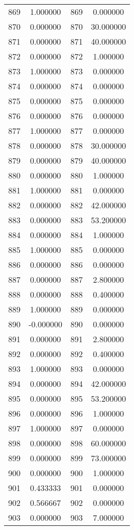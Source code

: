\documentclass[12pt]{article}
\begin{document}
\begin{longtable}{@{}cccc@{}}
869 & 1.000000 & 869 & 0.000000 \\
870 & 0.000000 & 870 & 30.000000 \\
871 & 0.000000 & 871 & 40.000000 \\
872 & 0.000000 & 872 & 1.000000 \\
873 & 1.000000 & 873 & 0.000000 \\
874 & 0.000000 & 874 & 0.000000 \\
875 & 0.000000 & 875 & 0.000000 \\
876 & 0.000000 & 876 & 0.000000 \\
877 & 1.000000 & 877 & 0.000000 \\
878 & 0.000000 & 878 & 30.000000 \\
879 & 0.000000 & 879 & 40.000000 \\
880 & 0.000000 & 880 & 1.000000 \\
881 & 1.000000 & 881 & 0.000000 \\
882 & 0.000000 & 882 & 42.000000 \\
883 & 0.000000 & 883 & 53.200000 \\
884 & 0.000000 & 884 & 1.000000 \\
885 & 1.000000 & 885 & 0.000000 \\
886 & 0.000000 & 886 & 0.000000 \\
887 & 0.000000 & 887 & 2.800000 \\
888 & 0.000000 & 888 & 0.400000 \\
889 & 1.000000 & 889 & 0.000000 \\
890 & -0.000000 & 890 & 0.000000 \\
891 & 0.000000 & 891 & 2.800000 \\
892 & 0.000000 & 892 & 0.400000 \\
893 & 1.000000 & 893 & 0.000000 \\
894 & 0.000000 & 894 & 42.000000 \\
895 & 0.000000 & 895 & 53.200000 \\
896 & 0.000000 & 896 & 1.000000 \\
897 & 1.000000 & 897 & 0.000000 \\
898 & 0.000000 & 898 & 60.000000 \\
899 & 0.000000 & 899 & 73.000000 \\
900 & 0.000000 & 900 & 1.000000 \\
901 & 0.433333 & 901 & 0.000000 \\
902 & 0.566667 & 902 & 0.000000 \\
903 & 0.000000 & 903 & 7.000000 \\

\end{longtable}
\end{document}
